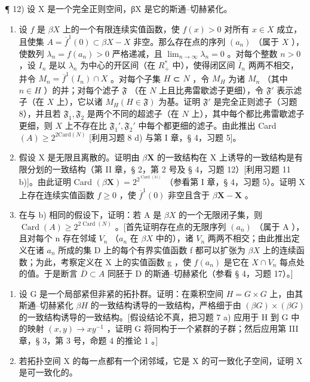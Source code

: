 ¶ 12) 设 X 是一个完全正则空间，βX 是它的斯通–切赫紧化。

\begin{enumerate}
\def\labelenumi{\alph{enumi})}
\item
  设 \(f\) 是 \(\beta X\) 上的一个有限连续实值函数，使 \(f(x) > 0\) 对所有 \(x \in X\) 成立，且使集 \(A = \overline{f}^1(0) \subset \beta X - X\) 非空。那么存在点的序列 \((a_n)\) （属于 \(X\) ），使数列 \(\lambda_n = f(a_n) > 0\) 严格递减，且 \(\lim_{n \to \infty} \lambda_n = 0\) 。对每个整数 \(n > 0\) ，设 \(I_n\) 是以 \(\lambda_n\) 为中心的开区间（在 \(R_+^*\) 中），使得闭区间 \(\overline{I}_n\) 两两不相交，并令 \(M_n = \overline{f}^1(I_n) \cap X\) 。对每个子集 \(H\) ⊂ \(N\) ，令 \(M_H\) 为诸 \(M_n\) （其中 \(n \in H\) ）的并；对每个滤子 \(\mathfrak{F}\) （在 \(N\) 上且比弗雷歇滤子更细），令 \(\mathfrak{F}'\) 表示滤子（在 \(X\) 上），它以诸 \(M_H(H \in \mathfrak{F})\) 为基。证明 \(\mathfrak{F}'\) 是完全正则滤子（习题 8），并且若 \(\mathfrak{F}_1, \mathfrak{F}_2\) 是两个不同的超滤子（在 \(N\) 上），其中每个都比弗雷歇滤子更细，则 \(X\) 上不存在比 \(\mathfrak{F}_1', \mathfrak{F}_2'\) 中每个都更细的滤子。由此推出 Card \((A) \geqslant 2^{2\text{Card}(N)}\) {[}利用习题 8 d) 与第 I 章，§ 4，习题 5{]}。
\item
  假设 X 是无限且离散的。证明由 \(\beta\mathbf{X}\) 的一致结构在 X 上诱导的一致结构是有限分划的一致结构（第 II 章，§ 2，第 2 号及 § 4，习题 12）{[}利用习题 11 b){]}。由此证明 Card \((\beta\mathbf{X}) = 2^{2^{\operatorname{Card}(\mathbb{N})}}\) （参看第 I 章，§ 4，习题 5）。证明 X 上存在连续实值函数 \(f \geqslant 0\) ，使 \(\overline{f}^{1}(0)\) 非空且含于 \(\beta\mathbf{X} - \mathbf{X}\) 。
\item
  在与 b) 相同的假设下，证明：若 A 是 \(\beta X\) 的一个无限闭子集，则 \(\operatorname{Card}(A) \geqslant 2^{2\operatorname{Card}(N)}\) 。{[}首先证明存在点的无限序列 \((a_{n})\) （属于 A ），且对每个 n 存在邻域 \(V_{n}\) （\(a_{n}\) 在 \(\beta X\) 中的），诸 \(V_{n}\) 两两不相交；由此推出定义在诸 \(a_{n}\) 所成的集 D 上的每个有界实值函数 f 都可以扩张为 \(\beta X\) 上的连续函数；为此，考察定义在 X 上的实值函数 g ，使 \(f(a_{n})\) 是它在 \(X \cap V_{n}\) 每点处的值。于是断言 \(\overline{D} \subset A\) 同胚于 D 的斯通–切赫紧化（参看 § 4，习题 17）。{]}
\end{enumerate}

\begin{enumerate}
\def\labelenumi{\arabic{enumi})}
\setcounter{enumi}{12}
\item
  设 G 是一个局部紧但非紧的拓扑群。证明：在乘积空间 \(H = G \times G\) 上，由其斯通–切赫紧化 \(\beta H\) 的一致结构诱导的一致结构，严格细于由 \((\beta G) \times (\beta G)\) 的一致结构诱导的一致结构。{[}假设结论不真，把习题 7 a) 应用于 H 到 G 中的映射 \((x, y) \to xy^{-1}\) ，证明 G 将同构于一个紧群的子群；然后应用第 III 章，§ 3，第 3 号，命题 4 的推论 1 。{]}
\item
  若拓扑空间 X 的每一点都有一个闭邻域，它是 X 的可一致化子空间，证明 X 是可一致化的。
\end{enumerate}

